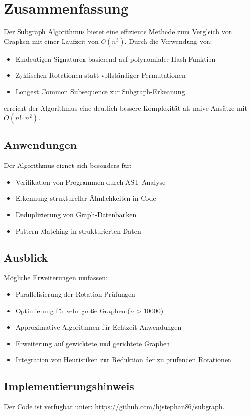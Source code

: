 \documentclass[a4paper,12pt]{article}
\theoremstyle{definition}
\begin{document}
\section{Zusammenfassung}

Der Subgraph Algorithmus bietet eine effiziente Methode zum Vergleich von Graphen mit einer Laufzeit von $O(n^3)$. Durch die Verwendung von:

\begin{itemize}
	\item Eindeutigen Signaturen basierend auf polynomialer Hash-Funktion
	\item Zyklischen Rotationen statt vollständiger Permutationen
	\item Longest Common Subsequence zur Subgraph-Erkennung
\end{itemize}

erreicht der Algorithmus eine deutlich bessere Komplexität als naive Ansätze mit $O(n! \cdot n^2)$.

\subsection{Anwendungen}

Der Algorithmus eignet sich besonders für:
\begin{itemize}
	\item Verifikation von Programmen durch AST-Analyse
	\item Erkennung struktureller Ähnlichkeiten in Code
	\item Deduplizierung von Graph-Datenbanken
	\item Pattern Matching in strukturierten Daten
\end{itemize}

\subsection{Ausblick}

Mögliche Erweiterungen umfassen:
\begin{itemize}
	\item Parallelisierung der Rotation-Prüfungen
	\item Optimierung für sehr große Graphen ($n > 10000$)
	\item Approximative Algorithmen für Echtzeit-Anwendungen
	\item Erweiterung auf gewichtete und gerichtete Graphen
	\item Integration von Heuristiken zur Reduktion der zu prüfenden Rotationen
\end{itemize}

\subsection{Implementierungshinweis}

Der Code ist verfügbar unter: \url{https://github.com/hjstephan86/subgraph}.
\end{document}
